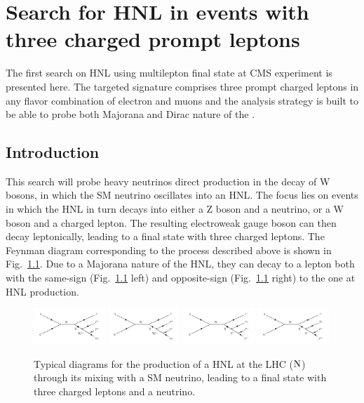 \chapter{Search for HNL in events with three charged prompt
  leptons~\cite{Sirunyan:2018mtv}} \label{Chapter5}
The first search on HNL using multilepton final state at CMS
experiment is presented here. The targeted signature comprises 
three prompt charged leptons in any flavor combination of electron
and muons and the analysis strategy is built to be able to probe both
Majorana and Dirac nature of the \hnl. 

\section{Introduction}
This search will probe heavy neutrinos direct production in the decay of W bosons, in which the SM neutrino oscillates into an HNL. The focus lies on events in which the HNL in turn decays into either a Z boson and a neutrino, or a W boson and a charged lepton. The resulting electroweak gauge boson can then decay leptonically, leading to a final state with three charged leptons. The Feynman diagram corresponding to the process described above is shown in 
Fig.~\ref{fig:c5hnldiagram}. Due to a Majorana nature of the HNL, they can decay to a lepton both with the same-sign (Fig.~\ref{fig:c5hnldiagram} left) 
and opposite-sign (Fig.~\ref{fig:c5hnldiagram} right) to the one at HNL
production. 
\begin{figure}[h]
\centering
\includegraphics[width=0.24\textwidth]{Figures/c5/hnl_feyn.pdf}
\includegraphics[width=0.24\textwidth]{Figures/c5/hnl_feyn_2.pdf}
\includegraphics[width=0.24\textwidth]{Figures/c5/hnl_z_feyn.pdf}
\includegraphics[width=0.24\textwidth]{Figures/c5/hnl_z_feyn_2.pdf}
\caption{Typical diagrams for the production of a HNL at the LHC 
($\mathrm{N}$) through its mixing with a SM neutrino, leading to a
final state with three charged leptons and a neutrino.}
\label{fig:c5hnldiagram}
\end{figure}

